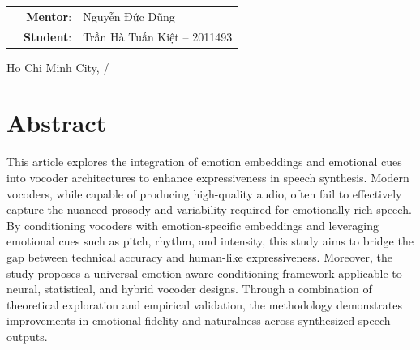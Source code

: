 \documentclass[12pt,a4paper]{article}
\begin{document}
\begin{titlepage}
    \vspace{1cm}
    \begin{table}[H]
        \begin{tabular}{rrl}
        \hspace{5 cm} & \textbf{Mentor}: & Nguyễn Đức Dũng\\
        
        & \textbf{Student}: & Trần Hà Tuấn Kiệt -- 2011493 \\
        
        \end{tabular}
        \end{table}
    \vspace{1cm}

    \begin{center}
        {\large Ho Chi Minh City, \the\month/\the\year}
    \end{center}
\end{titlepage}

\newpage

\renewcommand{\contentsname}{Table of Contents}
\renewcommand{\listfigurename}{List of Figures}
\renewcommand{\listtablename}{List of Tables}
\renewcommand{\bibname}{References}
\renewcommand{\figurename}{Figure}

\tableofcontents
\newpage


\section*{Abstract}
This article explores the integration of emotion embeddings and emotional cues
into vocoder architectures to enhance expressiveness in speech synthesis. Modern
vocoders, while capable of producing high-quality audio, often fail to
effectively capture the nuanced prosody and variability required for emotionally
rich speech. By conditioning vocoders with emotion-specific embeddings and
leveraging emotional cues such as pitch, rhythm, and intensity, this study aims
to bridge the gap between technical accuracy and human-like expressiveness.
Moreover, the study proposes a universal emotion-aware conditioning framework
applicable to neural, statistical, and hybrid vocoder designs. Through a
combination of theoretical exploration and empirical validation, the methodology
demonstrates improvements in emotional fidelity and naturalness across
synthesized speech outputs.
\newpage
\end{document}
